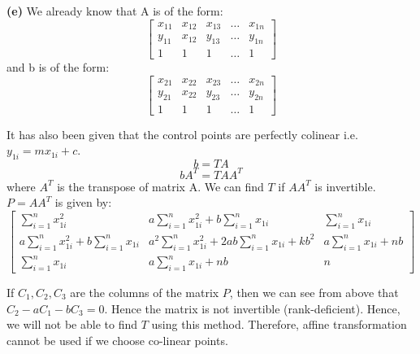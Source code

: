 \documentclass[12pt]{article}
\begin{document}
\textbf{(e)}
We already know that A is of the form:
\[
    \begin{bmatrix}
        x_{11} & x_{12} & x_{13} & \dots & x_{1n} \\
        y_{11} & x_{12} & y_{13} & \dots & y_{1n} \\
        1 & 1 & 1 & \dots & 1
    \end{bmatrix}
\]
and b is of the form:
\[
    \begin{bmatrix}
        x_{21} & x_{22} & x_{23} & \dots & x_{2n} \\
        y_{21} & x_{22} & y_{23} & \dots & y_{2n} \\
        1 & 1 & 1 & \dots & 1
    \end{bmatrix}
\]

It has also been given that the control points are perfectly colinear i.e. $y_{1i} = mx_{1i}+c$. 
\[b = TA\]
\[bA^T = TAA^T\]
where $A^T$ is the transpose of matrix A. We can find $T$ if $AA^T$ is invertible. $P = AA^T$ is given by:
\[
    \begin{bmatrix}
        \sum_{i=1}^nx_{1i}^2 & a\sum_{i=1}^nx_{1i}^2 + b\sum_{i=1}^nx_{1i} & \sum_{i=1}^nx_{1i}\\
        a\sum_{i=1}^nx_{1i}^2 + b\sum_{i=1}^nx_{1i} &  a^2\sum_{i=1}^nx_{1i}^2 + 2ab\sum_{i=1}^nx_{1i} + kb^2 & a\sum_{i=1}^nx_{1i} + nb\\
        \sum_{i=1}^nx_{1i} & a\sum_{i=1}^nx_{1i} + nb & n
    \end{bmatrix}
\]

If $C_1, C_2, C_3$ are the columns of the matrix $P$, then we can see from above that $C_2 - aC_1 - bC_3 = 0$. Hence the matrix is not invertible (rank-deficient). Hence, we will not be able to find $T$ using this method. Therefore, affine transformation cannot be used if we choose co-linear points.
\end{document}
